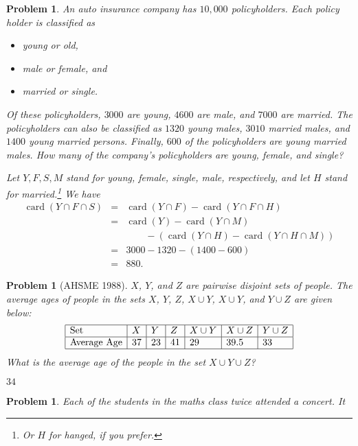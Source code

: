 \documentclass[11pt, openany]{book}
\theoremstyle{change} \theoremheaderfont{\blue\sffamily\bfseries}
\newtheorem{pro}[thm]{Problem}
\theoremstyle{nonumberplain} \theoremheaderfont{\sffamily\bfseries}
\newcommand{\í}{\'{\i}}
\def\card#1{\operatorname{card}\left(#1\right)}
\begin{document}
\begin{multicols}{2}
\begin{pro}
An auto insurance company has $10,000$ policyholders. Each policy
holder is classified as
\begin{center} \begin{itemize}\item young or old, \item male or female, and \item married or single. \end{itemize}\end{center}
Of these policyholders, $3000$ are young, $4600$ are male, and
$7000$ are married. The policyholders can also be classified as
$1320$ young males, $3010$ married males, and $1400$ young married
persons. Finally, $600$ of the policyholders are young married
males. How many of the company's policyholders are young, female,
and single? \begin{answer} Let $Y, F, S, M$ stand for young, female,
single, male, respectively, and let $H$ stand for
married.\footnote{Or $H$ for {\em hanged}, if you prefer.} We have
$$\begin{array}{lll}\card{Y\cap F \cap S} & = & \card{Y\cap F} - \card{Y\cap F \cap H} \\
& =  &\card{Y} - \card{Y\cap M}  \\
& & \qquad - (\card{Y\cap H}  - \card{Y\cap H
\cap M}) \\
& = & 3000 - 1320 - (1400 - 600) \\
& = & 880.
\end{array}
$$
\end{answer}
\end{pro}
   \begin{pro}[AHSME 1988] $X$, $Y$, and $Z$ are pairwise disjoint
sets of people. The average ages of people in the sets $X$, $Y$,
$Z$, $X\cup Y$, $X\cup Y$, and $Y\cup Z$ are given below:
$$\begin{array}{|l|l|l|l|l|l|l|}\hline \mathrm{Set} & X & Y & Z & X\cup Y & X\cup Z & Y \cup Z \\
\hline \mathrm{Average\ Age} & 37 & 23 & 41 & 29 & 39.5 & 33 \\
\hline
\end{array}$$
What is  the average age of the people in the set $X\cup Y \cup
Z$?\begin{answer}$34$
\end{answer}
      \end{pro}
    \begin{pro}
Each of the students in the maths class twice attended a concert. It

\end{pro}
\end{multicols}
\end{document}
